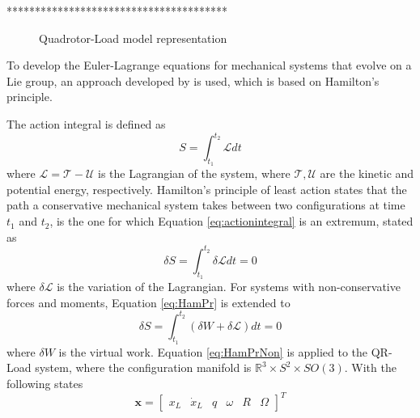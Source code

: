 ***************************************\\


\begin{figure}[h!]
	\centering
	\caption{Quadrotor-Load model representation\label{fig:QRLmodel}}
\end{figure}		





To develop the Euler-Lagrange equations for mechanical systems that evolve on a Lie group, an approach developed by \cite{Lee2008,Lee2005,Lee2009,Lee2011} is used, which is based on Hamilton's principle. 

The action integral is defined as
\begin{equation}\label{eq:actionintegral}
S=\int_{t_1}^{t_2}\mathcal{L}dt
\end{equation}
where $\mathcal{L}=\mathcal{T}-\mathcal{U} $ is the Lagrangian of the system, where $\mathcal{T},\mathcal{U}$ are the kinetic and potential energy, respectively. Hamilton's principle of least action states that the path a conservative mechanical system takes between two configurations at time $ t_1 $ and $ t_2 $, is the one for which Equation \ref{eq:actionintegral} is an extremum, stated as
\begin{equation}\label{eq:HamPr}
\delta S=\int_{t_1}^{t_2}\delta\mathcal{L}dt=0
\end{equation}
where $ \delta\mathcal{L} $ is the variation of the Lagrangian. For systems with non-conservative forces and moments, Equation \ref{eq:HamPr} is extended to
\begin{equation}\label{eq:HamPrNon}
\delta S=\int_{t_1}^{t_2}(\delta W+\delta\mathcal{L})dt=0
\end{equation}
where $ \delta W $ is the virtual work. Equation \ref{eq:HamPrNon} is applied to the QR-Load system, where the configuration manifold is $ \mathbb{R}^3\times S^2\times SO(3) $. With the following states
\begin{equation}\label{key}
\textbf{x}= \begin{bmatrix}x_L& \dot{x}_L& q& \omega&R&\Omega
\end{bmatrix}^T
\end{equation}


